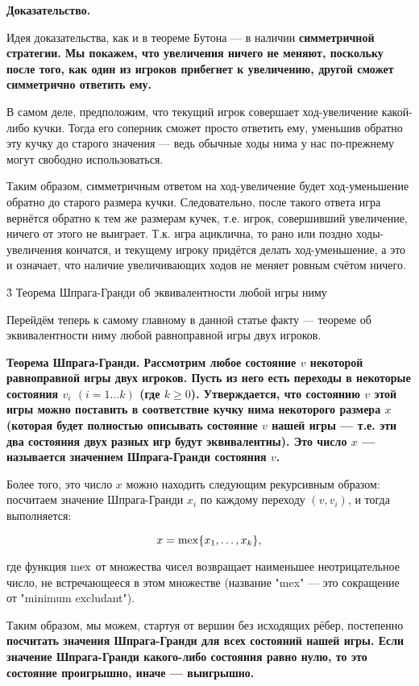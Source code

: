 \bf{Доказательство}.

Идея доказательства, как и в теореме Бутона --- в наличии \bf{симметричной стратегии}. Мы покажем, что увеличения ничего не меняют, поскольку после того, как один из игроков прибегнет к увеличению, другой сможет симметрично ответить ему.

В самом деле, предположим, что текущий игрок совершает ход-увеличение какой-либо кучки. Тогда его соперник сможет просто ответить ему, уменьшив обратно эту кучку до старого значения --- ведь обычные ходы нима у нас по-прежнему могут свободно использоваться.

Таким образом, симметричным ответом на ход-увеличение будет ход-уменьшение обратно до старого размера кучки. Следовательно, после такого ответа игра вернётся обратно к тем же размерам кучек, т.е. игрок, совершивший увеличение, ничего от этого не выиграет. Т.к. игра ациклична, то рано или поздно ходы-увеличения кончатся, и текущему игроку придётся делать ход-уменьшение, а это и означает, что наличие увеличивающих ходов не меняет ровным счётом ничего.


\h3{ Теорема Шпрага-Гранди об эквивалентности любой игры ниму }

Перейдём теперь к самому главному в данной статье факту --- теореме об эквивалентности ниму любой равноправной игры двух игроков.

\bf{Теорема Шпрага-Гранди}. Рассмотрим любое состояние $v$ некоторой равноправной игры двух игроков. Пусть из него есть переходы в некоторые состояния $v_i$ $(i=1 \ldots k)$ (где $k \ge 0$). Утверждается, что состоянию $v$ этой игры можно поставить в соответствие кучку нима некоторого размера $x$ (которая будет полностью описывать состояние $v$ нашей игры --- т.е. эти два состояния двух разных игр будут эквивалентны). Это число $x$ --- называется \bf{значением Шпрага-Гранди} состояния $v$.

Более того, это число $x$ можно находить следующим рекурсивным образом: посчитаем значение Шпрага-Гранди $x_i$ по каждому переходу $(v,v_i)$, и тогда выполняется:

$$ x = {\rm mex} \{ x_1, \ldots, x_k \}, $$

где функция $\rm mex$ от множества чисел возвращает наименьшее неотрицательное число, не встречающееся в этом множестве (название "mex" --- это сокращение от "minimum excludant").

Таким образом, мы можем, стартуя от вершин без исходящих рёбер, постепенно \bf{посчитать значения Шпрага-Гранди для всех состояний нашей игры}. Если значение Шпрага-Гранди какого-либо состояния равно нулю, то это состояние проигрышно, иначе --- выигрышно.

